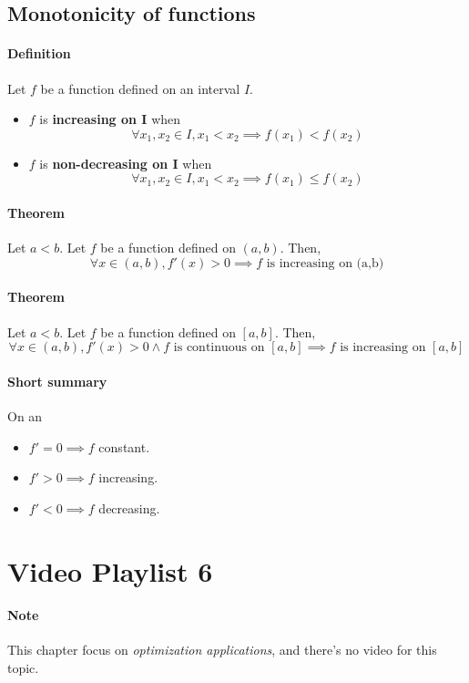 \documentclass{article}
\begin{document}
	\subsection{Monotonicity of functions}
	\paragraph{Definition} Let $f$ be a function defined on an interval $I$.
	\begin{itemize}
		\item $f$ is \textbf{increasing on I} when
			\[
			\forall x_1, x_2 \in I, x_1 < x_2 \implies f(x_1) < f(x_2)
			\]
		\item $f$ is \textbf{non-decreasing on I} when
			\[
			\forall x_1, x_2 \in I, x_1 < x_2 \implies f(x_1) \leq f(x_2)
			\]
	\end{itemize}
	\paragraph{Theorem} Let $a < b$. Let $f$ be a function defined on $(a,b)$. Then,
	\[
		\forall x \in (a,b), f'(x) > 0 \implies f \text{ is increasing on (a,b)}
	\]
	\paragraph{Theorem} Let $a < b$. Let $f$ be a function defined on $[a,b]$. Then,
	\[
		\forall x \in (a,b), f'(x) > 0 \land f \text{ is continuous on }[a,b] \implies f \text{ is increasing on }[a,b]
	\]
	\paragraph{Short summary} On an 
	\begin{itemize}
		\item $f' = 0 \implies f$ constant.
		\item $f' > 0 \implies f$ increasing.
		\item $f' < 0 \implies f$ decreasing.
	\end{itemize}
	
	\section{Video Playlist 6}
	\paragraph{Note} This chapter focus on \emph{optimization applications}, and there's no video for this topic.
\end{document}
